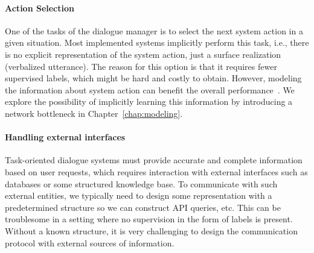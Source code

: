 \paragraph{Action Selection}
One of the tasks of the dialogue manager is to select the next system action in a given situation.
Most implemented systems implicitly perform this task, i.e., there is no explicit representation of the system action, just a surface realization (verbalized utterance).
The reason for this option is that it requires fewer supervised labels, which might be hard and costly to obtain.
However, modeling the information about system action can benefit the overall performance~\cite{DBLP:conf/aaai/LiangTCY20}.
We explore the possibility of implicitly learning this information by introducing a network bottleneck in Chapter~\ref{chap:modeling}.

\paragraph{Handling external interfaces}
Task-oriented dialogue systems must provide accurate and complete information based on user requests, which requires interaction with external interfaces such as databases or some structured knowledge base.
To communicate with such external entities, we typically need to design some representation with a predetermined structure so we can construct API queries, etc.
This can be troublesome in a setting where no supervision in the form of labels is present.
Without a known structure, it is very challenging to design the communication protocol with external sources of information.

